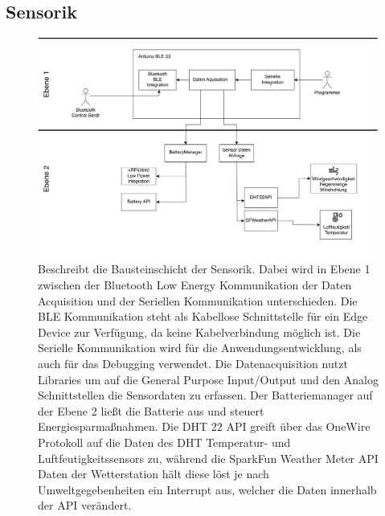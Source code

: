\documentclass[
]{article}
\begin{document}
\subsection{Sensorik}
\begin{figure}[H]
	\centering
	\includegraphics[width=130mm]{resources/Bausteinschicht_Sara.png}
	\caption{Beschreibt die Bausteinschicht der Sensorik. Dabei wird in Ebene 1 zwischen der Bluetooth Low Energy Kommunikation der Daten Acquisition und der Seriellen Kommunikation unterschieden. Die BLE Kommunikation steht als Kabellose Schnittstelle für ein Edge Device zur Verfügung, da keine Kabelverbindung möglich ist. Die Serielle Kommunikation wird für die Anwendungsentwicklung, als auch für das Debugging verwendet. Die Datenacquisition nutzt Libraries um auf die General Purpose Input/Output und den Analog Schnittstellen die Sensordaten zu erfassen. Der Batteriemanager auf der Ebene 2 ließt die Batterie aus und steuert Energiesparmaßnahmen. Die DHT 22 API greift über das OneWire Protokoll auf die Daten des DHT Temperatur- und Luftfeutigkeitssensors zu, während die SparkFun Weather Meter API Daten der Wetterstation hält diese löst je nach Umweltgegebenheiten ein Interrupt aus, welcher die Daten innerhalb der API verändert.}
	\label{fig:BausteinSensorik}
\end{figure}  
\end{document}
